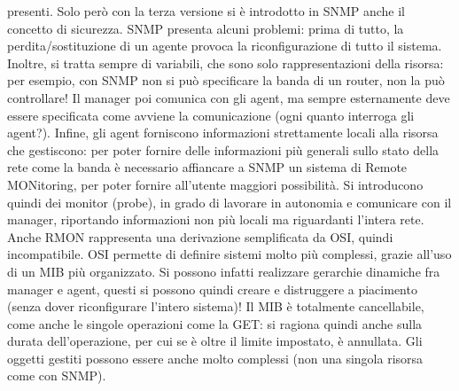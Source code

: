 presenti. Solo però con la terza versione si è introdotto in SNMP anche il concetto di sicurezza.
SNMP presenta alcuni problemi: prima di tutto, la perdita/sostituzione di un agente provoca la riconfigurazione di
tutto il sistema. Inoltre, si tratta sempre di variabili, che sono solo rappresentazioni della risorsa: per esempio,
con SNMP non si può specificare la banda di un router, non la può controllare! Il manager poi comunica con gli agent,
ma sempre esternamente deve essere specificata come avviene la comunicazione (ogni quanto interroga gli agent?).
Infine, gli agent forniscono informazioni strettamente locali alla risorsa che gestiscono:
per poter fornire delle informazioni più generali sullo stato della rete come la banda è necessario affiancare a SNMP un sistema di Remote MONitoring, per poter fornire all'utente maggiori possibilità. Si introducono quindi dei monitor (probe), in grado di lavorare in autonomia e comunicare con il manager, riportando informazioni non più locali ma riguardanti l'intera rete. Anche RMON rappresenta una derivazione semplificata da OSI, quindi incompatibile.
OSI permette di definire sistemi molto più complessi, grazie all'uso di un MIB più organizzato. Si possono infatti
realizzare gerarchie dinamiche fra manager e agent, questi si possono quindi creare e distruggere a piacimento (senza
dover riconfigurare l'intero sistema)! Il MIB è totalmente cancellabile, come anche le singole operazioni come la GET: si ragiona quindi anche sulla durata dell'operazione, per cui se è oltre il limite impostato, è annullata. Gli oggetti gestiti possono essere anche molto complessi (non una singola risorsa come con SNMP).
